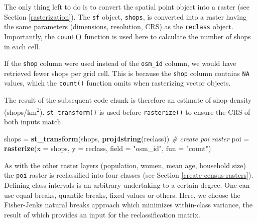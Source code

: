 \documentclass[]{krantz}
\newenvironment{Shaded}{\begin{snugshade}}{\end{snugshade}}
\newcommand{\CommentTok}[1]{\textcolor[rgb]{0.37,0.37,0.37}{\textit{#1}}}
\newcommand{\DataTypeTok}[1]{\textcolor[rgb]{0.27,0.27,0.27}{#1}}
\newcommand{\KeywordTok}[1]{\textcolor[rgb]{0.27,0.27,0.27}{\textbf{#1}}}
\newcommand{\NormalTok}[1]{#1}
\newcommand{\StringTok}[1]{\textcolor[rgb]{0.5,0.5,0.5}{#1}}
\let\BeginKnitrBlock\begin \let\EndKnitrBlock\end
\begin{document}
The only thing left to do is to convert the spatial point object into a raster (see Section \ref{rasterization}).
The \texttt{sf} object, \texttt{shops}, is converted into a raster having the same parameters (dimensions, resolution, CRS) as the \texttt{reclass} object.
Importantly, the \texttt{count()} function is used here to calculate the number of shops in each cell.

\BeginKnitrBlock{rmdnote}
If the \texttt{shop} column were used instead of the \texttt{osm\_id} column, we would have retrieved fewer shops per grid cell.
This is because the \texttt{shop} column contains \texttt{NA} values, which the \texttt{count()} function omits when rasterizing vector objects.
\EndKnitrBlock{rmdnote}

The result of the subsequent code chunk is therefore an estimate of shop density (shops/km\textsuperscript{2}).
\texttt{st\_transform()} is used before \texttt{rasterize()} to ensure the CRS of both inputs match.

\begin{Shaded}
\begin{Highlighting}[]
\NormalTok{shops =}\StringTok{ }\KeywordTok{st_transform}\NormalTok{(shops, }\KeywordTok{proj4string}\NormalTok{(reclass))}
\CommentTok{# create poi raster}
\NormalTok{poi =}\StringTok{ }\KeywordTok{rasterize}\NormalTok{(}\DataTypeTok{x =}\NormalTok{ shops, }\DataTypeTok{y =}\NormalTok{ reclass, }\DataTypeTok{field =} \StringTok{"osm_id"}\NormalTok{, }\DataTypeTok{fun =} \StringTok{"count"}\NormalTok{)}
\end{Highlighting}
\end{Shaded}

As with the other raster layers (population, women, mean age, household size) the \texttt{poi} raster is reclassified into four classes (see Section \ref{create-census-rasters}).
Defining class intervals is an arbitrary undertaking to a certain degree.
One can use equal breaks, quantile breaks, fixed values or others.
Here, we choose the Fisher-Jenks natural breaks approach which minimizes within-class variance, the result of which provides an input for the reclassification matrix.
\end{document}
